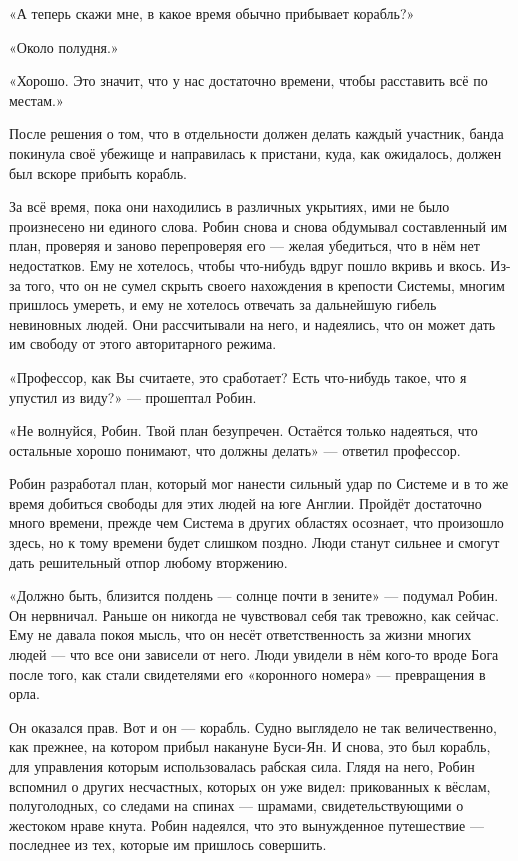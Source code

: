 \documentclass[a5paper, 9pt,
final, openany, twoside=true]{memoir}
\begin{document}
«А теперь скажи мне, в какое время обычно прибывает корабль?»

«Около полудня.»

«Хорошо. Это значит, что у нас достаточно времени, чтобы расставить всё по местам.»\bigskip

После решения о том, что в отдельности должен делать каждый участник, банда покинула своё убежище и направилась к пристани, куда, как ожидалось, должен был вскоре прибыть корабль.

За всё время, пока они находились в различных укрытиях, ими не было произнесено ни единого слова. Робин снова и снова обдумывал составленный им план, проверяя и заново перепроверяя его — желая убедиться, что в нём нет недостатков. Ему не хотелось, чтобы что-нибудь вдруг пошло вкривь и вкось. Из-за того, что он не сумел скрыть своего нахождения в крепости Системы, многим пришлось умереть, и ему не хотелось отвечать за дальнейшую гибель невиновных людей. Они рассчитывали на него, и надеялись, что он может дать им свободу от этого авторитарного режима.

«Профессор, как Вы считаете, это сработает? Есть что-нибудь такое, что я упустил из виду?» — прошептал Робин.

«Не волнуйся, Робин. Твой план безупречен. Остаётся только надеяться, что остальные хорошо понимают, что должны делать» — ответил профессор.\bigskip

Робин разработал план, который мог нанести сильный удар по Системе и в то же время добиться свободы для этих людей на юге Англии. Пройдёт достаточно много времени, прежде чем Система в других областях осознает, что произошло здесь, но к тому времени будет слишком поздно. Люди станут сильнее и смогут дать решительный отпор любому вторжению.

«Должно быть, близится полдень — солнце почти в зените» — подумал Робин. Он нервничал. Раньше он никогда не чувствовал себя так тревожно, как сейчас. Ему не давала покоя мысль, что он несёт ответственность за жизни многих людей — что все они зависели от него. Люди увидели в нём кого-то вроде Бога после того, как стали свидетелями его «коронного номера» — превращения в орла.\bigskip

Он оказался прав. Вот и он — корабль. Судно выглядело не так величественно, как прежнее, на котором прибыл накануне Буси-Ян. И снова, это был корабль, для управления которым использовалась рабская сила. Глядя на него, Робин вспомнил о других несчастных, которых он уже видел: прикованных к вёслам, полуголодных, со следами на спинах — шрамами, свидетельствующими о жестоком нраве кнута. Робин надеялся, что это вынужденное путешествие — последнее из тех, которые им пришлось совершить.
\end{document}
